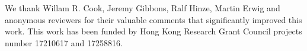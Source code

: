 \documentclass[english,submission]{programming}
\begin{document}










\acks We thank Willam R. Cook, Jeremy Gibbons, Ralf Hinze, Martin Erwig and anonymous
reviewers for their valuable comments that significantly improved this work.
This work has been funded by Hong Kong Research Grant Council projects number
17210617 and 17258816.




\end{document}

